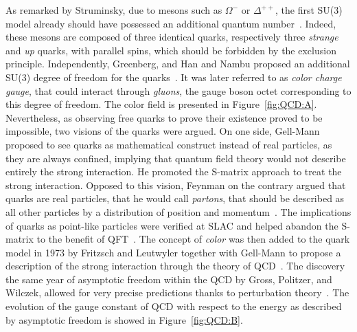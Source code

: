 	As remarked by Struminsky, due to mesons such as $\Omega^-$ or $\Delta^{++}$, the first SU(3) model already should have possessed an additional quantum number~\cite{STRUMINSKY1965}. Indeed, these mesons are composed of three identical quarks, respectively three \textit{strange} and \textit{up} quarks, with parallel spins, which should be forbidden by the exclusion principle. Independently, Greenberg, and Han and Nambu proposed an additional SU(3) degree of freedom for the quarks~\cite{GREENBERG1964,HANNAMBU1965}. It was later referred to as \textit{color charge gauge}, that could interact through \textit{gluons}, the gauge boson octet corresponding to this degree of freedom. The color field is presented in Figure~\ref{fig:QCD:A}. Nevertheless, as observing free quarks to prove their existence proved to be impossible, two visions of the quarks were argued. On one side, Gell-Mann proposed to see quarks as mathematical construct instead of real particles, as they are always confined, implying that quantum field theory would not describe entirely the strong interaction. He promoted the S-matrix approach to treat the strong interaction. Opposed to this vision, Feynman on the contrary argued that quarks are real particles, that he would call \textit{partons}, that should be described as all other particles by a distribution of position and momentum~\cite{FEYNMAN1969}. The implications of quarks as point-like particles were verified at SLAC and helped abandon the S-matrix to the benefit of QFT~\cite{BJORKEN1969}. The concept of \textit{color} was then added to the quark model in 1973 by Fritzsch and Leutwyler together with Gell-Mann to propose a description of the strong interaction through the theory of \acf{QCD}~\cite{FRITZSCH1973}. The discovery the same year of asymptotic freedom within the QCD by Gross, Politzer, and Wilczek, allowed for very precise predictions thanks to perturbation theory~\cite{GROSS1973,POLITZER1973}. The evolution of the gauge constant of QCD with respect to the energy as described by asymptotic freedom is showed in Figure~\ref{fig:QCD:B}.
	
